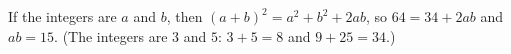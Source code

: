If the integers are $a$ and $b$, then $(a+b)^2=a^2+b^2+2ab$, so $64=34+2ab$ and $ab=\boxed{15}$. (The integers are $3$ and $5$: $3+5=8$ and $9+25=34$.)
